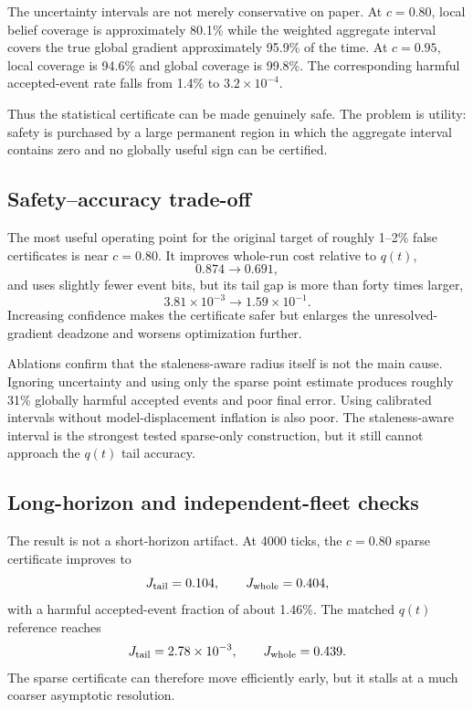 The uncertainty intervals are not merely conservative on paper. At $c=0.80$, local belief coverage is approximately 80.1\% while the weighted aggregate interval covers the true global gradient approximately 95.9\% of the time. At $c=0.95$, local coverage is 94.6\% and global coverage is 99.8\%. The corresponding harmful accepted-event rate falls from 1.4\% to $3.2\times10^{-4}$.

Thus the statistical certificate can be made genuinely safe. The problem is utility: safety is purchased by a large permanent region in which the aggregate interval contains zero and no globally useful sign can be certified.

\subsection{Safety--accuracy trade-off}

The most useful operating point for the original target of roughly 1--2\% false certificates is near $c=0.80$. It improves whole-run cost relative to $q(t)$,
\begin{equation}
  0.874\rightarrow0.691,
\end{equation}
and uses slightly fewer event bits, but its tail gap is more than forty times larger,
\begin{equation}
  3.81\times10^{-3}\rightarrow1.59\times10^{-1}.
\end{equation}
Increasing confidence makes the certificate safer but enlarges the unresolved-gradient deadzone and worsens optimization further.

Ablations confirm that the staleness-aware radius itself is not the main cause. Ignoring uncertainty and using only the sparse point estimate produces roughly 31\% globally harmful accepted events and poor final error. Using calibrated intervals without model-displacement inflation is also poor. The staleness-aware interval is the strongest tested sparse-only construction, but it still cannot approach the $q(t)$ tail accuracy.

\subsection{Long-horizon and independent-fleet checks}

The result is not a short-horizon artifact. At 4000 ticks, the $c=0.80$ sparse certificate improves to
\begin{equation}
  J_{\rm tail}=0.104,
  \qquad
  J_{\rm whole}=0.404,
\end{equation}
with a harmful accepted-event fraction of about 1.46\%. The matched $q(t)$ reference reaches
\begin{equation}
  J_{\rm tail}=2.78\times10^{-3},
  \qquad
  J_{\rm whole}=0.439.
\end{equation}
The sparse certificate can therefore move efficiently early, but it stalls at a much coarser asymptotic resolution.

